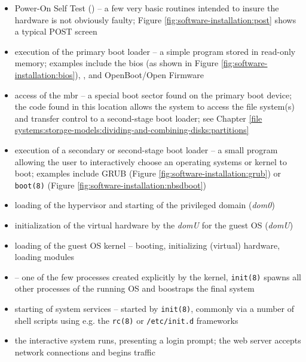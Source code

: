 \begin{itemize}
	\item Power-On Self Test () -- a few very basic routines
		intended to insure the hardware is not obviously faulty;
		Figure \ref{fig:software-installation:post} shows a typical POST screen
	\item execution of the primary boot loader
		-- a simple program stored in read-only memory; examples include
		the \gls{bios} (as shown in Figure
		\ref{fig:software-installation:bios}), ,
		and OpenBoot/Open Firmware
	\item access of the \gls{mbr} -- a special boot sector
		found on the primary boot device; the code found in this
		location allows the system to access the file system(s)
		and transfer control to a second-stage boot loader;
		see Chapter \ref{file systems:storage-models:dividing-and-combining-disks:partitions}
	\item execution of a secondary or second-stage boot loader --
		 a small program allowing
		the user to interactively choose an operating systems or
		kernel to boot; examples include GRUB (Figure
		\ref{fig:software-installation:grub}) or
		{\tt boot(8)}
		(Figure  \ref{fig:software-installation:nbsdboot})
	\item loading of the hypervisor and starting
		of the privileged domain ({\em dom0})
	\item initialization of the virtual hardware
		by the {\em domU} for the guest OS ({\em domU})
	\item loading of the guest OS kernel -- booting, initializing (virtual) hardware, loading
		modules
	\item {} -- one of the few processes created
		explicitly by the kernel, {\tt init(8)} spawns all other
		processes of the running OS and boostraps the final system
	\item starting of system services -- started by {\tt init(8)}, commonly via a
		number of shell scripts using e.g. the {\tt rc(8)} or
		{\tt /etc/init.d} frameworks
	\item the interactive system runs, presenting a login prompt; the web server
		accepts network connections and begins traffic
\end{itemize}

